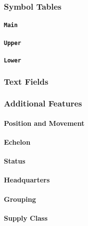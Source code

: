 \documentclass[a4paper, titlepage]{article}
\begin{document}
\subsubsection{Symbol Tables}

\paragraph{\texttt{Main}}

\paragraph{\texttt{Upper}}

\paragraph{\texttt{Lower}}

\subsubsection{Text Fields}

\subsubsection{Additional Features}

\paragraph{Position and Movement}

\paragraph{Echelon}

\paragraph{Status}

\paragraph{Headquarters}

\paragraph{Grouping}

\paragraph{Supply Class}
\end{document}
